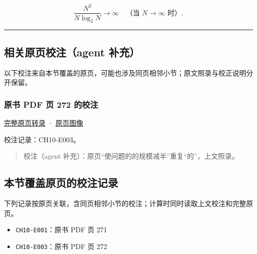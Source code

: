 \documentclass[
  10pt,
  fontset=fandol]{ctexart}
\providecommand{\tightlist}{%
  \setlength{\itemsep}{0pt}\setlength{\parskip}{0pt}}
\begin{document}
\[
\frac{N^2}{N\log_2N}\to\infty\quad\text{（当 }N\to\infty\text{ 时）}.
\]

\begin{center}\rule{0.5\linewidth}{0.5pt}\end{center}

\subsection{相关原页校注（agent 补充）}\label{ux76f8ux5173ux539fux9875ux6821ux6ce8agent-ux8865ux5145}

以下校注来自本节覆盖的原页，可能也涉及同页相邻小节；原文照录与校正说明分开保留。

\subsubsection{原书 PDF 页 272 的校注}\label{ux539fux4e66-pdf-ux9875-272-ux7684ux6821ux6ce8}

\href{../pages/pdf-272.md}{完整原页转录} · \href{../../source-images/pdf-272.jpeg}{原页图像}

校注记录：CH10-E003。

\begin{quote}
校注（agent 补充）：原页``使问题的的规模减半''重复``的''，上文照录。
\end{quote}

\subsection{本节覆盖原页的校注记录}\label{ux672cux8282ux8986ux76d6ux539fux9875ux7684ux6821ux6ce8ux8bb0ux5f55}

下列记录按原页关联，含同页相邻小节的校注；计算时同时读取上文校注和完整原页。

\begin{itemize}
\tightlist
\item
  \texttt{CH10-E001}：原书 PDF 页 271
\item
  \texttt{CH10-E003}：原书 PDF 页 272
\end{itemize}
\end{document}
